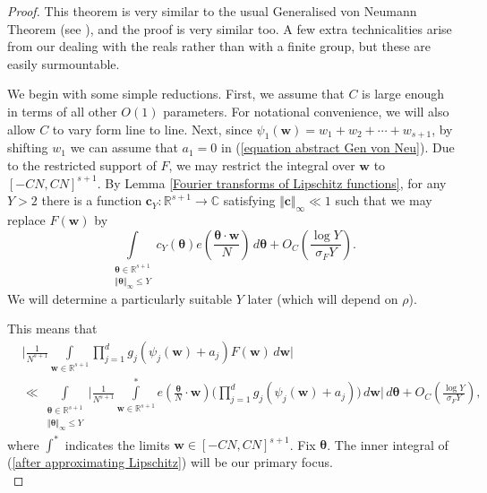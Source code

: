 \documentclass[12pt,a4paper,twoside,reqno]{amsart}
\numberwithin{equation}{section}
\begin{document}
\begin{proof}
This theorem is very similar to the usual Generalised von Neumann Theorem (see \cite[Exercise 1.3.23]{Ta12}), and the proof is very similar too. A few extra technicalities arise from our dealing with the reals rather than with a finite group, but these are easily surmountable. 

We begin with some simple reductions. First, we assume that $C$ is large enough in terms of all other $O(1)$ parameters. For notational convenience, we will also allow $C$ to vary form line to line. Next, since $\psi_1(\mathbf{w}) = w_1+w_2+\cdots+w_{s+1}$, by shifting $w_1$ we can assume that $a_1 = 0$ in (\ref{equation abstract Gen von Neu}). Due to the restricted support of $F$, we may restrict the integral over $\mathbf{w}$ to $[-CN,CN]^{s+1}$. By Lemma \ref{Fourier transforms of Lipschitz functions}, for any $Y>2$ there is a function $\mathbf{c}_Y:\mathbb{R}^{s+1} \longrightarrow \mathbb{C}$ satisfying $\Vert \mathbf{c}\Vert_\infty \ll 1$ such that we may replace $F(\mathbf{w})$ by \[ \int\limits_{\substack{\mathbf{\boldsymbol{\theta}} \in \mathbb{R}^{s+1}\\ \Vert \boldsymbol{\theta} \Vert_\infty \leqslant Y}} c_Y(\boldsymbol{\theta})e(\frac{\boldsymbol{\theta}\cdot \mathbf{w}}{N}) \, d\boldsymbol{\theta} + O_C\left(\frac{\log Y}{\sigma_F Y}\right).\] We will determine a particularly suitable $Y$ later (which will depend on $\rho$). 

This means that \begin{align}
\label{after approximating Lipschitz}
&\Big\vert\frac{1}{N^{s+1}} \int\limits_{\mathbf{w}\in \mathbb{R}^{s+1}} \prod\limits_{j=1}^d g_j (\psi_j(\mathbf{w}) + a_j)  F(\mathbf{w})\, d\mathbf{w}\Big\vert \nonumber \\
& \ll \int\limits_{\substack{\boldsymbol{\theta} \in \mathbb{R}^{s+1}\\ \Vert \boldsymbol{\theta} \Vert_\infty \leqslant Y}} \Big\vert\frac{1}{N^{s+1}} \int\limits_{\mathbf{w} \in \mathbb{R}^{s+1}}^*e(\frac{\boldsymbol{\theta}}{N}\cdot \mathbf{w}) \Big( \prod\limits_{j=1}^d g_j (\psi_j(\mathbf{w}) + a_j)\Big) \, d\mathbf{w} \Big\vert \, d\boldsymbol{\theta} + O_C\left(\frac{\log Y}{\sigma_F Y}\right),
\end{align}
\noindent where $\int^*$ indicates the limits $\mathbf{w} \in [-CN,CN]^{s+1}$. Fix $\boldsymbol{\theta}$. The inner integral of (\ref{after approximating Lipschitz}) will be our primary focus. \\


\end{proof}
\end{document}
